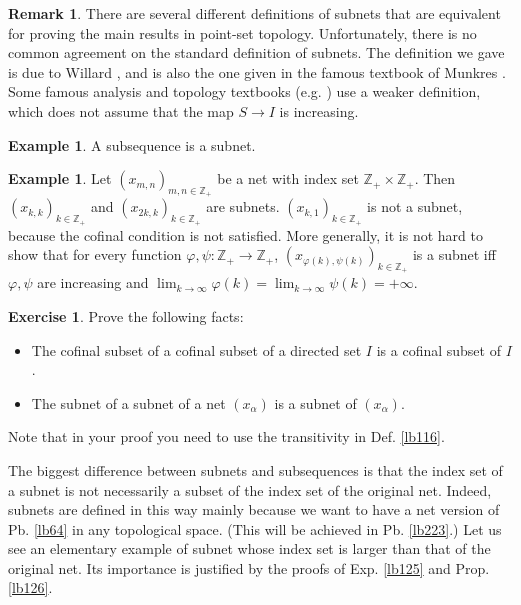 \documentclass[12pt,b5paper,notitlepage]{article}
\theoremstyle{definition}
\newtheorem{eg}[df]{Example}
\newtheorem{exe}[df]{Exercise}
\newtheorem{rem}[df]{Remark}
\theoremstyle{plain}
\newcommand{\Zbb}{\mathbb Z}
\numberwithin{equation}{section}
\begin{document}
\begin{rem}
There are several different definitions of subnets that are equivalent for proving the main results in point-set topology. Unfortunately, there is no common agreement on the standard definition of subnets. The definition we gave is due to Willard \cite{Wil}, and is also the one given in the famous textbook of Munkres \cite{Mun}. Some famous analysis and topology textbooks (e.g. \cite{Fol,Kel,RS}) use a weaker definition, which does not assume that the map $S\rightarrow I$ is increasing.
\end{rem}




\begin{eg}
A subsequence is a subnet.
\end{eg}

\begin{eg}\label{lb118}
Let $(x_{m,n})_{m,n\in\Zbb_+}$ be a net with index set $\Zbb_+\times\Zbb_+$. Then $(x_{k,k})_{k\in\Zbb_+}$ and $(x_{2k,k})_{k\in\Zbb_+}$ are subnets. $(x_{k,1})_{k\in\Zbb_+}$ is not a subnet, because the cofinal condition is not satisfied. More generally, it is not hard to show that for every function $\varphi,\psi:\Zbb_+\rightarrow\Zbb_+$, $(x_{\varphi(k),\psi(k)})_{k\in\Zbb_+}$ is a subnet iff $\varphi,\psi$ are increasing and $\lim_{k\rightarrow\infty}\varphi(k)=\lim_{k\rightarrow\infty}\psi(k)=+\infty$.
\end{eg}

\begin{exe}
Prove the following facts:
\begin{itemize}
\item The cofinal subset of a cofinal subset of a directed set $I$ is a cofinal subset of $I$.
\item  The subnet of a subnet of a net $(x_\alpha)$ is a subnet of $(x_\alpha)$. 
\end{itemize}
Note that in your proof you need to use the transitivity in Def. \ref{lb116}.
\end{exe}


The biggest difference between subnets and subsequences is that the index set of a subnet is not necessarily a subset of the index set of the original net. Indeed, subnets are defined in this way mainly because we want to have a net version of Pb. \ref{lb64} in any topological space. (This will be achieved in Pb. \ref{lb223}.) Let us see an elementary example of subnet whose index set is larger than that of the original net. Its importance is justified by the proofs of Exp. \ref{lb125} and Prop. \ref{lb126}.
\end{document}

